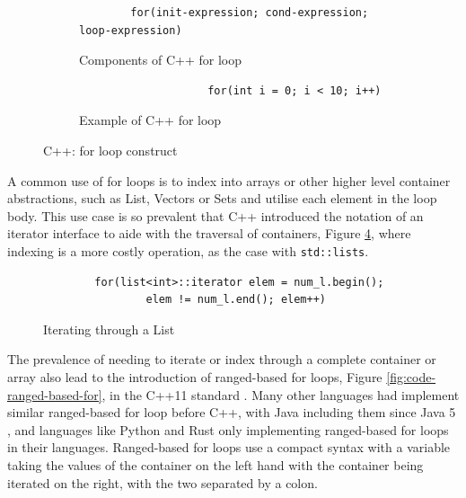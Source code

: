 \documentclass[bsc,frontabs,singlespacing,twoside,parskip,deptreport]{infthesis}
\begin{document}
\begin{figure}[H]
    \centering
    \begin{subfigure}[h]{\textwidth}
        \centering
        \begin{verbatim}
        for(init-expression; cond-expression; loop-expression)
        \end{verbatim}
        \caption{Components of C++ for loop}
        \label{fig:code-for-loop-components}
        \vspace{0.40cm}
    \end{subfigure}
    
    \begin{subfigure}[h]{\textwidth}
    \begin{verbatim}
                    for(int i = 0; i < 10; i++)
    \end{verbatim}
    \caption{Example of C++ for loop}
    \centering
    \label{fig:code-for-loop-example}
    \end{subfigure}
    \caption{C++: for loop construct}
    \label{fig:code-for-loop}
\end{figure}

A common use of for loops is to index into arrays or other higher level container abstractions, such as List, Vectors or Sets and utilise each element in the loop body. This use case is so prevalent that C++ introduced the notation of an iterator interface \cite{ITER_CPP} to aide with the traversal of containers, Figure \ref{fig:code-iterator}, where indexing is a more costly operation, as the case with \texttt{std::lists}. 

\begin{figure}[H]
    \begin{verbatim}
        for(list<int>::iterator elem = num_l.begin();
                elem != num_l.end(); elem++)
    \end{verbatim}
    \caption{Iterating through a List}
    \centering
    \label{fig:code-iterator}
\end{figure}

The prevalence of needing to iterate or index through a complete container or array also lead to the introduction of ranged-based for loops, Figure \ref{fig:code-ranged-based-for}, in the C++11 standard \cite{RANGED_FOR_CPP}. Many other languages had implement similar ranged-based for loop before C++, with Java including them since Java 5 \cite{JAVA_RANGE}, and languages like Python and Rust only implementing ranged-based for loops in their languages. Ranged-based for loops use a compact syntax with a variable taking the values of the container on the left hand with the container being iterated on the right, with the two separated by a colon. 
\end{document}
